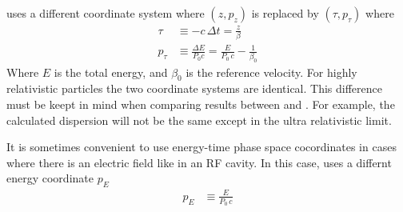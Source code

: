 \mad uses a different coordinate system where $(z, p_z)$ is replaced by $(\tau, p_\tau)$ where
\begin{align}
  \tau & \equiv -c \, \Delta t = \frac{z}{\beta} \\
  p_\tau &\equiv \frac{\Delta E}{P_0 c} = \frac{E}{P_0 \, c} - \frac{1}{\beta_0} 
\end{align}
Where $E$ is the total energy, and $\beta_0$ is the reference velocity. For highly relativistic
particles the two coordinate systems are identical.  This difference must be keept in mind when
comparing results between \bmad and \mad. For example, the calculated dispersion will not be the
same except in the ultra relativistic limit.

It is sometimes convenient to use energy-time phase space cocordinates in cases where there is
an electric field like in an RF cavity. In this case, \bmad uses a differnt energy coordinate $p_E$
\begin{align}
  p_E &\equiv \frac{E}{P_0 \, c}
\end{align}

